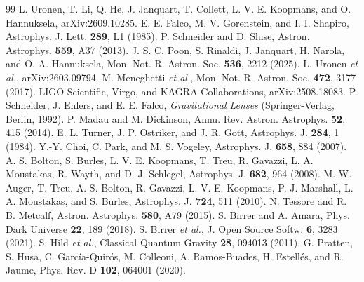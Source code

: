 \begin{thebibliography}{99}
L. Uronen, T. Li, Q. He, J. Janquart, T. Collett, L. V. E. Koopmans, and O. Hannuksela, arXiv:2609.10285.
E. E. Falco, M. V. Gorenstein, and I. I. Shapiro, Astrophys. J. Lett. \textbf{289}, L1 (1985).
P. Schneider and D. Sluse, Astron. Astrophys. \textbf{559}, A37 (2013).
J. S. C. Poon, S. Rinaldi, J. Janquart, H. Narola, and O. A. Hannuksela, Mon. Not. R. Astron. Soc. \textbf{536}, 2212 (2025).
L. Uronen \textit{et al.}, arXiv:2603.09794.
M. Meneghetti \textit{et al.}, Mon. Not. R. Astron. Soc. \textbf{472}, 3177 (2017).
LIGO Scientific, Virgo, and KAGRA Collaborations, arXiv:2508.18083.
P. Schneider, J. Ehlers, and E. E. Falco, \textit{Gravitational Lenses} (Springer-Verlag, Berlin, 1992).
P. Madau and M. Dickinson, Annu. Rev. Astron. Astrophys. \textbf{52}, 415 (2014).
E. L. Turner, J. P. Ostriker, and J. R. Gott, Astrophys. J. \textbf{284}, 1 (1984).
Y.-Y. Choi, C. Park, and M. S. Vogeley, Astrophys. J. \textbf{658}, 884 (2007).
A. S. Bolton, S. Burles, L. V. E. Koopmans, T. Treu, R. Gavazzi, L. A. Moustakas, R. Wayth, and D. J. Schlegel, Astrophys. J. \textbf{682}, 964 (2008).
M. W. Auger, T. Treu, A. S. Bolton, R. Gavazzi, L. V. E. Koopmans, P. J. Marshall, L. A. Moustakas, and S. Burles, Astrophys. J. \textbf{724}, 511 (2010).
N. Tessore and R. B. Metcalf, Astron. Astrophys. \textbf{580}, A79 (2015).
S. Birrer and A. Amara, Phys. Dark Universe \textbf{22}, 189 (2018).
S. Birrer \textit{et al.}, J. Open Source Softw. \textbf{6}, 3283 (2021).
S. Hild \textit{et al.}, Classical Quantum Gravity \textbf{28}, 094013 (2011).
G. Pratten, S. Husa, C. Garc{\'i}a-Quir{\'o}s, M. Colleoni, A. Ramos-Buades, H. Estell{\'e}s, and R. Jaume, Phys. Rev. D \textbf{102}, 064001 (2020).

\end{thebibliography}
